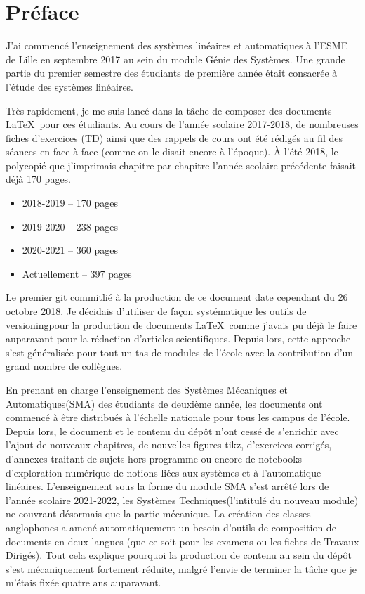 \chapter*{Préface}
\thispagestyle{plain}
J'ai commencé l'enseignement des systèmes linéaires et automatiques
à l'ESME de Lille en septembre 2017 au sein du module \og Génie des Systèmes\fg.
Une grande partie du premier semestre des étudiants de première année
était consacrée à l'étude des systèmes linéaires.

Très rapidement, je me suis lancé dans la tâche
de composer des documents \LaTeX~pour ces étudiants.
Au cours de l'année scolaire 2017-2018, de nombreuses fiches
d'exercices (TD) ainsi que des rappels de cours ont été rédigés au
fil des séances en face à face (comme on le disait encore à l'époque). 
À l'été 2018, le polycopié que j'imprimais
chapitre par chapitre l'année scolaire précédente faisait déjà 170 pages.
\begin{itemize}
    \item 2018-2019 -- 170 pages
    \item 2019-2020 -- 238 pages
    \item 2020-2021 -- 360 pages
    \item Actuellement -- 397 pages
\end{itemize}
Le premier \og git commit\fg lié à la production de ce document date
cependant du 26 octobre 2018. Je décidais d'utiliser de façon systématique
les outils de \og versioning\fg pour la production de documents
\LaTeX~comme j'avais pu déjà le faire auparavant pour la rédaction
d'articles scientifiques. Depuis lors, cette approche s'est généralisée pour tout un
tas de modules de l'école avec la contribution d'un grand nombre de collègues.

En prenant en charge l'enseignement des \og Systèmes Mécaniques et Automatiques\fg (SMA)
des étudiants de deuxième année, les documents ont commencé à être distribués
à l'échelle nationale pour tous les campus de l'école.
Depuis lors, le document et le contenu du dépôt n'ont cessé de s'enrichir avec l'ajout
de nouveaux chapitres, de nouvelles figures tikz, d'exercices corrigés, d'annexes
traitant de sujets hors programme ou encore de notebooks d'exploration
numérique de notions liées aux systèmes et à l'automatique linéaires.
L'enseignement sous la forme du module SMA s'est arrêté lors de l'année
scolaire 2021-2022, les \og Systèmes Techniques\fg (l'intitulé du
nouveau module) ne couvrant désormais que la partie mécanique.
La création des classes anglophones a amené automatiquement un besoin
d'outils de composition de documents en deux langues (que ce soit pour les examens
ou les fiches de \og Travaux Dirigés\fg). Tout cela explique pourquoi la production
de contenu au sein du dépôt s'est mécaniquement fortement réduite,
malgré l'envie de terminer la tâche que je m'étais fixée quatre ans auparavant.

